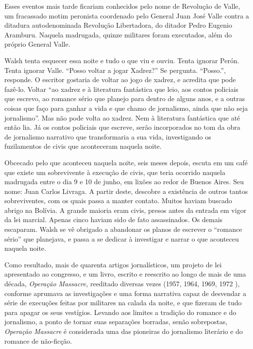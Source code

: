 Esses eventos mais tarde ficariam conhecidos pelo nome de Revolução de
Valle, um fracassado motim peronista coordenado pelo General Juan José
Valle contra a ditadura autodenominada Revolução Libertadora, do ditador
Pedro Eugenio Aramburu. Naquela madrugada, quinze militares foram
executados, além do próprio General Valle.

Walsh tenta esquecer essa noite e tudo o que viu e ouviu. Tenta ignorar
Perón. Tenta ignorar Valle. ``Posso voltar a jogar Xadrez?'' Se
pergunta. ``Posso.'', responde. O escritor gostaria de voltar ao jogo de
xadrez, e acredita que pode fazê-lo. Voltar ``ao xadrez e à literatura
fantástica que leio, aos contos policiais que escrevo, ao romance sério
que planejo para dentro de alguns anos, e a outras coisas que faço para
ganhar a vida e que chamo de jornalismo, ainda que não seja
jornalismo''. Mas não pode volta ao xadrez. Nem à literatura fantástica
que até então lia. Já os contos policiais que escreve, serão
incorporados no tom da obra de jornalismo narrativo que transformaria a
sua vida, investigando os fuzilamentos de civis que aconteceram naquela
noite.

Obcecado pelo que aconteceu naquela noite, seis meses depois, escuta em
um café que existe um sobrevivente à execução de civis, que teria
ocorrido naquela madrugada entre o dia 9 e 10 de junho, em lixões ao
redor de Buenos Aires. Seu nome: Juan Carlos Livraga. A partir deste,
descobre a existência de outros tantos sobreviventes, com os quais passa
a manter contato. Muitos haviam buscado abrigo na Bolívia. A grande
maioria eram civis, presos antes da entrada em vigor da lei marcial.
Apenas cinco haviam sido de fato assassinados. Os demais escaparam.
Walsh se vê obrigado a abandonar os planos de escrever o ``romance
sério'' que planejava, e passa a se dedicar à investigar e narrar o que
aconteceu naquela noite.

Como resultado, mais de quarenta artigos jornalísticos, um projeto de
lei apresentado ao congresso, e um livro, escrito e reescrito ao longo
de mais de uma década, \emph{Operação Massacre,} reeditado diversas
vezes (1957, 1964, 1969, 1972 ), conforme aprumava as investigações e
uma forma narrativa capaz de desvendar a série de execuções feitas por
militares na calada da noite, e que fizeram de tudo para apagar os seus
vestígios. Levando aos limites a tradição do romance e do jornalismo, a
ponto de tornar suas separações borradas, senão sobrepostas,
\emph{Operação Massacre} é considerada uma das pioneiras do jornalismo
literário e do romance de não-ficção.

